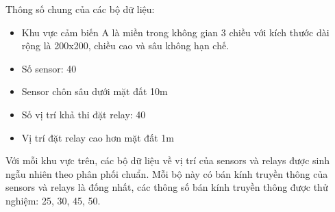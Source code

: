 Thông số chung của các bộ dữ liệu:
\begin{itemize}
    \item Khu vực cảm  biến A là miền trong không gian 3 chiều với kích thước dài rộng là 200x200, chiều cao và sâu không hạn chế.
    \item Số sensor: 40  
    \item Sensor chôn sâu dưới mặt đất 10m
    \item Số vị trí khả thi đặt relay: 40 
    \item Vị trí đặt relay cao hơn mặt đất 1m
\end{itemize}
Với mỗi khu vực trên, các bộ dữ liệu về vị trí của sensors và relays được sinh ngẫu nhiên theo phân phối chuẩn. Mỗi bộ này có bán kính truyền thông của sensors và relays là đống nhất, các thông số bán kính truyền thông được thử nghiệm: 25, 30, 45, 50.

